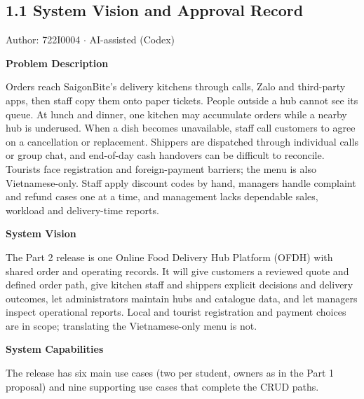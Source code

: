 \subsection*{1.1 System Vision and Approval Record}
Author: 722I0004 \ensuremath{\cdot} AI-assisted (Codex)

\textbf{Problem Description}

Orders reach SaigonBite's delivery kitchens through calls, Zalo and third-party apps, then staff copy them onto paper tickets. People outside a hub cannot see its queue. At lunch and dinner, one kitchen may accumulate orders while a nearby hub is underused. When a dish becomes unavailable, staff call customers to agree on a cancellation or replacement. Shippers are dispatched through individual calls or group chat, and end-of-day cash handovers can be difficult to reconcile. Tourists face registration and foreign-payment barriers; the menu is also Vietnamese-only. Staff apply discount codes by hand, managers handle complaint and refund cases one at a time, and management lacks dependable sales, workload and delivery-time reports.

\textbf{System Vision}

The Part 2 release is one Online Food Delivery Hub Platform (OFDH) with shared order and operating records. It will give customers a reviewed quote and defined order path, give kitchen staff and shippers explicit decisions and delivery outcomes, let administrators maintain hubs and catalogue data, and let managers inspect operational reports. Local and tourist registration and payment choices are in scope; translating the Vietnamese-only menu is not.

\textbf{System Capabilities}

The release has six main use cases (two per student, owners as in the Part 1 proposal) and nine supporting use cases that complete the CRUD paths.

